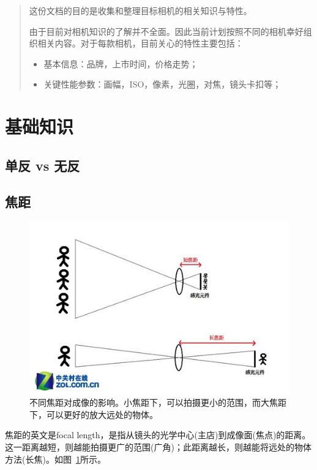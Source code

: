 \documentclass{ctexart}
\begin{document}
\tableofcontents

\begin{abstract}
这份文档的目的是收集和整理目标相机的相关知识与特性。

由于目前对相机知识的了解并不全面。因此当前计划按照不同的相机幸好组织相关内容。对于每款相机，目前关心的特性主要包括：
\begin{itemize}
    \item 基本信息：品牌，上市时间，价格走势；
    \item 关键性能参数：画幅，ISO，像素，光圈，对焦，镜头卡扣等；
\end{itemize}
\end{abstract}

\section{基础知识}

\subsection{单反 vs 无反}

\subsection{焦距~\cite{focal_length_shutter_etc}}
\begin{figure}[h!]
    \centering
    \label{fig_focal_length}
    \includegraphics[width=.8\linewidth]{imgs/focal_length.jpg}
    \caption{不同焦距对成像的影响。小焦距下，可以拍摄更小的范围，而大焦距下，可以更好的放大远处的物体。}
\end{figure}
焦距的英文是focal length，是指从镜头的光学中心(主店)到成像面(焦点)的距离。这一距离越短，则越能拍摄更广的范围(广角)；此距离越长，则越能将远处的物体方法(长焦)。如图~\ref{fig_focal_length}所示。
\end{document}
